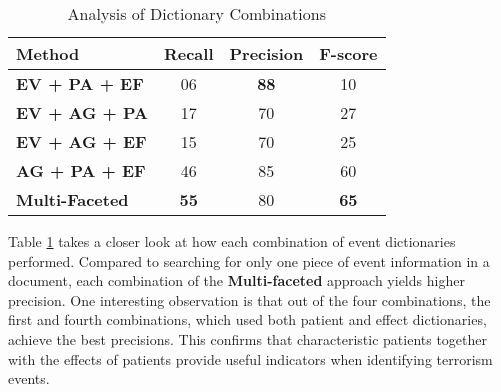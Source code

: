 \begin{table}[ht]
\small
\centering
\begin{tabular}[center]{|lccc|} \hline
{\bf Method} & {\bf Recall} & {\bf Precision} & {\bf F-score}\\ \hline 
                                                     
{\bf EV + PA + EF} & 06 & {\bf 88} & 10\\
{\bf EV + AG + PA} & 17 & 70 & 27\\
{\bf EV + AG + EF} & 15 & 70 & 25\\
{\bf AG + PA + EF} & 46 & 85 & 60\\ \hline
{\bf Multi-Faceted} & {\bf 55} & 80 & {\bf 65}\\ \hline

\end{tabular}
\caption{Analysis of Dictionary Combinations}
\label{ablation-table-terrorism}
\end{table}

Table \ref{ablation-table-terrorism} takes 
a closer look at how each combination of event dictionaries performed. 
Compared to searching for only one piece of event information in a document, 
each combination of the {\bf Multi-faceted} approach yields 
higher precision.
One interesting observation is that out of the four combinations, 
the first and fourth combinations, which 
used both patient and effect dictionaries, 
achieve the best precisions. 
This confirms that characteristic patients together with the 
effects of patients provide useful indicators when identifying terrorism events. 

